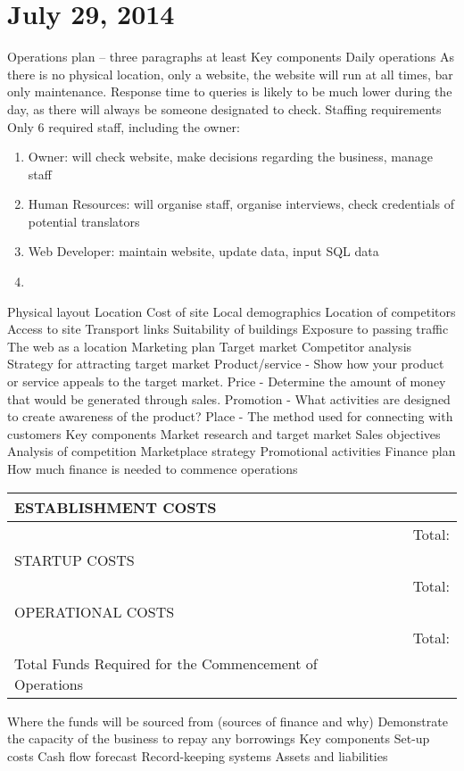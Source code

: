 \section{July 29, 2014}
\begin{outline}
\1 Operations plan -- three paragraphs at least
\2 Key components
\3 Daily operations
\4 As there is no physical location, only a website, the website will run at all times, bar only maintenance. Response time to queries is likely to be much lower during the day, as there will always be someone designated to check.
\3 Staffing requirements
\4 Only 6 required staff, including the owner:
\begin{enumerate}
\item Owner: will check website, make decisions regarding the business, manage staff
\item Human Resources: will organise staff, organise interviews, check credentials of potential translators
\item Web Developer: maintain website, update data, input SQL data
\item 
\end{enumerate}
\3 Physical layout
\3 Location
\3 Cost of site
\3 Local demographics
\3 Location of competitors
\3 Access to site
\3 Transport links
\3 Suitability of buildings
\3 Exposure to passing traffic
\3 The web as a location
\1 Marketing plan
\2 Target market
\2 Competitor analysis
\2 Strategy for attracting target market
\3 Product/service - Show how your product or service appeals to the target market.
\3 Price - Determine the amount of money that would be generated through sales.
\3 Promotion - What activities are designed to create awareness of the product?
\3 Place - The method used for connecting with customers
\2 Key components
\3 Market research and target market
\3 Sales objectives
\3 Analysis of competition
\3 Marketplace strategy
\3 Promotional activities
\1 Finance plan
\2 How much finance is needed to commence operations
\begin{tabular}{| p{8cm} | p{2cm} | p{2cm} |}
\hline
ESTABLISHMENT COSTS & & \\
\hline
 &  & Total: \\
\hline
STARTUP COSTS & & \\
\hline
 &  & Total: \\
\hline
OPERATIONAL COSTS & & \\
\hline
 &  & Total: \\
\hline
Total Funds Required for the Commencement of Operations & & \\
\hline
\end{tabular}
\2 Where the funds will be sourced from (sources of finance and why)
\2 Demonstrate the capacity of the business to repay any borrowings
\2 Key components
\3 Set-up costs
\3 Cash flow forecast
\3 Record-keeping systems
\3 Assets and liabilities
\end{outline}
